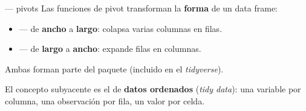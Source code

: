 \documentclass[8pt]{beamer}
\begin{document}
	\subtitle{Cheatsheet de \emph{pivots} en R}

	\begin{frame}[plain]
		\maketitle
	\end{frame}

	\begin{frame}{ — pivots}
		Las funciones de pivot transforman la \textbf{forma} de un data frame:

		\begin{itemize}
			\item {} — de \textbf{ancho} a \textbf{largo}: colapsa varias columnas en filas.
			\item {} — de \textbf{largo} a \textbf{ancho}: expande filas en columnas.
		\end{itemize}

		Ambas forman parte del paquete  (incluido en el \emph{tidyverse}).

		\begin{block}{}
			El concepto subyacente es el de \textbf{datos ordenados} (\emph{tidy data}): una variable por columna, una observación por fila, un valor por celda.
		\end{block}
	\end{frame}
\end{document}
